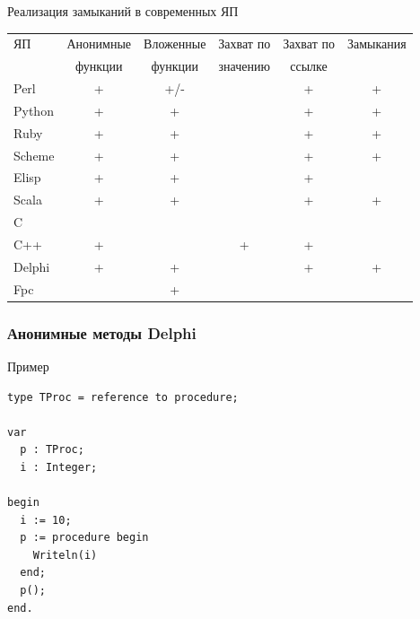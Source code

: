 \documentclass[roman,12pt]{beamer}
\newenvironment{changemargin}[2]{%
  \begin{list}{}{%
    \setlength{\topsep}{0pt}%
    \setlength{\leftmargin}{#1}%
    \setlength{\rightmargin}{#2}%
    \setlength{\listparindent}{\parindent}%
    \setlength{\itemindent}{\parindent}%
    \setlength{\parsep}{\parskip}%
  }%
  \item[]}{\end{list}}
\newcommand\Fontvi{\fontsize{11}{14}\selectfont}
\begin{document}
\begin{frame}{Реализация замыканий в современных ЯП}
\Fontvi
\begin{changemargin}{-1cm}{0cm} 

\begin{table}[h!]
\begin{center}
\begin{tabular}{|l|c|c|c|c|c|}
\hline
  ЯП     &  Анонимные  &  Вложенные  &  Захват по  &  Захват по  &  Замыкания  \\
         &  функции    &  функции    &  значению   &  ссылке     &             \\
\hline
 Perl    &  +          &  +/-        &             &  +          &  +          \\
\hline
 Python  &  +          &  +          &             &  +          &  +          \\
\hline
 Ruby    &  +          &  +          &             &  +          &  +          \\
\hline
 Scheme  &  +          &  +          &             &  +          &  +          \\
\hline
 Elisp   &  +          &  +          &             &  +          &             \\
\hline
 Scala   &  +          &  +          &             &  +          &  +          \\

\hline
 C       &             &             &             &             &             \\
\hline
 C++     &  +          &             &  +          &  +          &             \\
\hline
 Delphi  &  +          &  +          &             &  +          &  +          \\
\hline
 Fpc     &             &  +          &             &             &             \\
\hline
\end{tabular}
\end{center}
\end{table}

\end{changemargin}

\end{frame}

\begin{frame}[fragile]
  \frametitle{Анонимные методы Delphi}
 \begin{block}{Пример}
   \begin{lstlisting}
type TProc = reference to procedure;

var
  p : TProc;
  i : Integer;

begin
  i := 10;
  p := procedure begin
    Writeln(i)
  end;
  p();
end.
   \end{lstlisting}
 \end{block} 
\end{frame}
\end{document}
